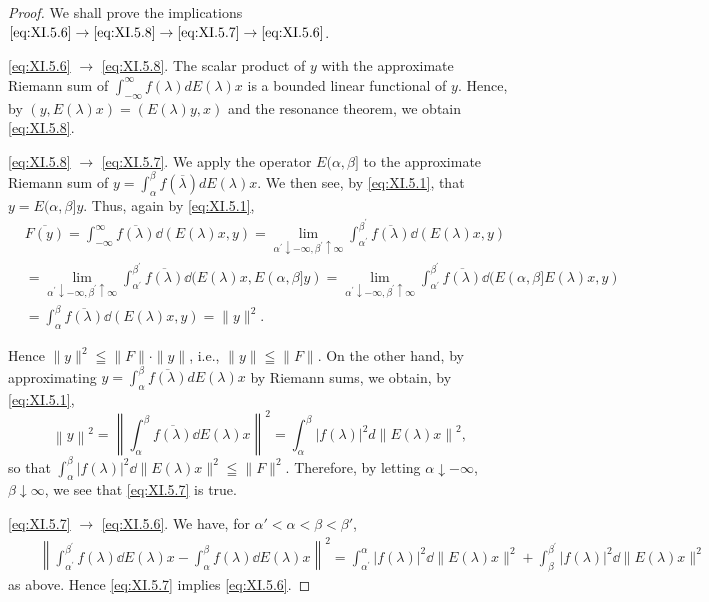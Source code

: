\begin{proof}
 We shall prove the implications $\eqref{eq:XI.5.6} \to \eqref{eq:XI.5.8} \to \eqref{eq:XI.5.7} \to \eqref{eq:XI.5.6}$. 


\eqref{eq:XI.5.6} $\rightarrow$ \eqref{eq:XI.5.8}. The scalar product of $y$ with the approximate Riemann sum of $\int_{-\infty}^{\infty} f(\lambda) dE(\lambda)x$ is a bounded linear functional of $y$. Hence, by $(y, E(\lambda)x) = (E(\lambda)y, x)$ and the resonance theorem, we obtain \eqref{eq:XI.5.8}. 

\eqref{eq:XI.5.8} $\rightarrow$ \eqref{eq:XI.5.7}. We apply the operator $E(\alpha, \beta]$ to the approximate Riemann sum of $y = \int_{\alpha}^{\beta} f(\overline{\lambda}) dE(\lambda)x$. We then see, by \eqref{eq:XI.5.1}, that $y = E(\alpha, \beta]y$. Thus, again by \eqref{eq:XI.5.1}, 
\[
\begin{aligned}
&\overline {{F (y)}} = \int_{- \infty} ^{\infty} \overline {{f (\lambda)}} \dd (E (\lambda) x, y) = \lim\limits _ {\alpha^{\prime} \downarrow - \infty , \beta^{\prime} \uparrow \infty} \int_ {\alpha^{\prime}} ^ {\beta^{\prime}} \overline {{f (\lambda)}} \dd (E (\lambda) x, y)
\\
&= \lim\limits _ {\alpha^{\prime} \downarrow - \infty , \beta^{\prime} \uparrow \infty} \int_ {\alpha^{\prime}} ^ {\beta^{\prime}} \overline {{f (\lambda)}} \dd (E (\lambda) x, E (\alpha , \beta ] y) = \lim\limits _ {\alpha^{\prime} \downarrow - \infty , \beta^{\prime} \uparrow \infty} \int_ {\alpha^{\prime}} ^ {\beta^{\prime}} \overline {{f (\lambda)}} \dd (E (\alpha , \beta ] E (\lambda) x, y)
\\
&= \int_{\alpha} ^{\beta} \overline {{f (\lambda)}} \dd (E (\lambda) x, y) = \| y \| ^{2}.
\end{aligned}
\]

Hence $\| y\| ^2 \leqq \| F\| \cdot \| y\|$, i.e., $\| y\| \leqq \| F\|$. On the other hand, by approximating $y = \int_{\alpha}^{\beta}\overline{f(\lambda)} dE(\lambda)x$ by Riemann sums, we obtain, by \eqref{eq:XI.5.1}, 
\[
\left\| y \right\| ^{2} = \left\| \int_{\alpha} ^{\beta} \overline {{f (\lambda)}} \dd E (\lambda) x \right\| ^{2} = \int_{\alpha} ^{\beta} | f (\lambda) | ^{2} d \left\| E (\lambda) x \right\| ^{2},
\]
so that $\int_{\alpha}^{\beta}|f(\lambda)|^2 \dd\|E(\lambda)x\|^2 \leqq \|F\|^2$. Therefore, by letting $\alpha \downarrow -\infty$, $\beta \downarrow \infty$, we see that \eqref{eq:XI.5.7} is true. 

\eqref{eq:XI.5.7} $\rightarrow$ \eqref{eq:XI.5.6}. We have, for $\alpha' < \alpha < \beta < \beta'$, 
\[
\begin{aligned}
&\quad \left\| \int_ {\alpha^{\prime}} ^ {\beta^{\prime}} f (\lambda) \dd E (\lambda) x - \int_{\alpha} ^{\beta} f (\lambda) \dd E (\lambda) x \right\| ^{2} = \int_ {\alpha^{\prime}} ^{\alpha} | f (\lambda) | ^{2} \dd \| E (\lambda) x \| ^{2} + \int_{\beta} ^ {\beta^{\prime}} | f (\lambda) | ^{2} \dd \| E (\lambda) x \| ^{2}
\end{aligned}
\]
as above. Hence \eqref{eq:XI.5.7} implies \eqref{eq:XI.5.6}.
\end{proof}

